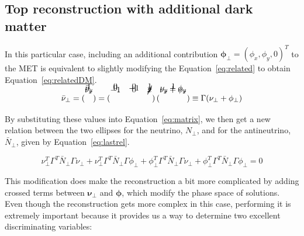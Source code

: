 \documentclass[a4paper, 10pt, openright]{report}
\begin{document}
\subsection{Top reconstruction with additional dark matter} \label{section:ttrecoDM}

In this particular case, including an additional contribution $\bm{\phi_\perp} = (\phi_x, \phi_y, 0)^T$ to the \ac{MET} is equivalent to slightly modifying the Equation~\ref{eq:related} to obtain Equation~\ref{eq:relatedDM}.

\begin{equation}
\label{eq:relatedDM}
\bar \nu_\perp = \begin{pmatrix}
\\[-1.3cm] \bar \nu_x \\[-0.5cm]
\bar \nu_y \\[-0.5cm]
1
\end{pmatrix} = \begin{pmatrix}
\\[-1.3cm] -1 & 0 & \cancel{x} \\[-0.5cm]
0 & -1 & \cancel{y} \\[-0.5cm]
0 & 0 & 1
\end{pmatrix} \begin{pmatrix}
\\[-1.3cm] \nu_x + \phi_x \\[-0.5cm]
\nu_y + \phi_y \\[-0.5cm]
1
\end{pmatrix} \equiv \Gamma (\nu_\perp + \phi_\perp)
\end{equation}

By substituting these values into Equation~\ref{eq:matrix}, we then get a new relation between the two ellipses for the neutrino, $N_\perp$, and for the antineutrino, $\bar N_\perp$, given by Equation~\ref{eq:lastrel}.

 \begin{equation}
\label{eq:lastrel}
\nu_\perp^T \Gamma^T \bar N_\perp \Gamma \nu_\perp + \nu_\perp^T \Gamma^T \bar N_\perp \Gamma \phi_\perp + \phi_\perp^T \Gamma^T \bar N_\perp \Gamma \nu_\perp + \phi_\perp^T \Gamma^T \bar N_\perp \Gamma \phi_\perp = 0
\end{equation}

This modification does make the reconstruction a bit more complicated by adding crossed terms between $\bm{\nu_\perp}$ and $\bm{\phi}$, which modify the phase space of solutions. Even though the reconstruction gets more complex in this case, performing it is extremely important because it provides us a way to determine two excellent discriminating variables:
\end{document}
